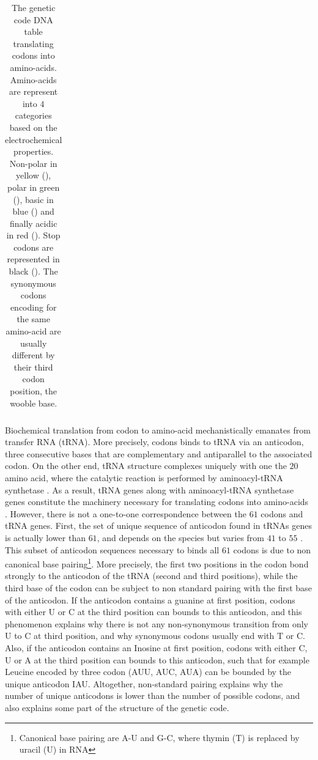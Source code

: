 \begin{table}[H]
{\begin{tabular}{|c||l|c|l|c|l|c|l|c||c|}
			\hline
	\end{tabular}}
	\caption[The Genetic Code]{
		The genetic code DNA table translating codons into amino-acids.
		Amino-acids are represent into $4$ categories based on the electrochemical properties.
		Non-polar in yellow (\textcolor{Nonpolar}{}), polar in green (\textcolor{Polar}{}), basic in blue (\textcolor{Basic}{}) and finally acidic in red (\textcolor{Acidic}{}).
		Stop codons are represented in black (\textcolor{Stop}{}).
		The synonymous codons encoding for the same amino-acid are usually different by their third codon position, the wooble base.
	}
	\label{table:genetic_code}
\end{table}

Biochemical translation from \gls{codon} to amino-acid mechanistically emanates from transfer \acrshort{RNA} (\acrshort{tRNA}).
More precisely, codons binds to \acrshort{tRNA} via an anticodon, three consecutive bases that are complementary and antiparallel to the associated \gls{codon}.
On the other end, \acrshort{tRNA} structure complexes uniquely with one the $20$ amino acid, where the catalytic reaction is performed by aminoacyl-tRNA synthetase \citep{Rich1976}.
As a result, \acrshort{tRNA} genes along with aminoacyl-tRNA synthetase genes constitute the machinery necessary for translating codons into amino-acids .
However, there is not a one-to-one correspondence between the $61$ codons and \acrshort{tRNA} genes.
First, the set of unique sequence of anticodon found in tRNAs genes is actually lower than $61$, and depends on the species but varies from $41$ to $55$ \citep{Goodenbour2006}.
This subset of anticodon sequences necessary to binds all $61$ codons is due to non canonical base pairing\footnote{Canonical base pairing are A-U and G-C, where thymin (T) is replaced by uracil (U) in RNA}.
More precisely, the first two positions in the codon bond strongly to the anticodon of the tRNA (second and third positions), while the third base of the codon can be subject to non standard pairing with the first base of the anticodon.
If the anticodon contains a guanine at first position, codons with either U or C at the third position can bounds to this anticodon, and this phenomenon explains why there is not any non-synonymous transition from only U to C at third position, and why synonymous codons usually end with T or C.
Also, if the anticodon contains an Inosine at first position, codons with either C, U or A at the third position can bounds to this anticodon, such that for example Leucine encoded by three codon (AUU, AUC, AUA) can be bounded by the unique anticodon IAU.
Altogether, non-standard pairing explains why the number of unique anticodons is lower than the number of possible codons, and also explains some part of the structure of the genetic code.

